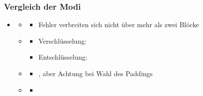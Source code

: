 \subsubsection*{Vergleich der Modi}
\begin{minipage}{0.5\textwidth}
    \begin{itemize}
        \item {}
        \begin{itemize}
            \item {}
            \begin{itemize}
                \item Fehler verbreiten sich nicht über mehr als zwei Blöcke
            \end{itemize}
            \item {}
            \begin{itemize}
                \item Verschlüsselung: 
                \item Entschlüsselung: 
            \end{itemize}
            \item {}
            \begin{itemize}
                \item {}, aber Achtung bei Wahl des Paddings
            \end{itemize}
            \item {}
            \begin{itemize}
                \item {}
            \end{itemize}
        \end{itemize}
    \end{itemize}
\end{minipage}
\hfill
